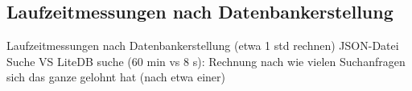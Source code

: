 \subsection{Laufzeitmessungen nach Datenbankerstellung} \label{subsec:Laufzeitmessungen}
Laufzeitmessungen nach Datenbankerstellung (etwa 1 std rechnen)
JSON-Datei Suche VS LiteDB suche (60 min vs 8 s): Rechnung nach wie vielen Suchanfragen sich das ganze gelohnt hat (nach etwa einer)